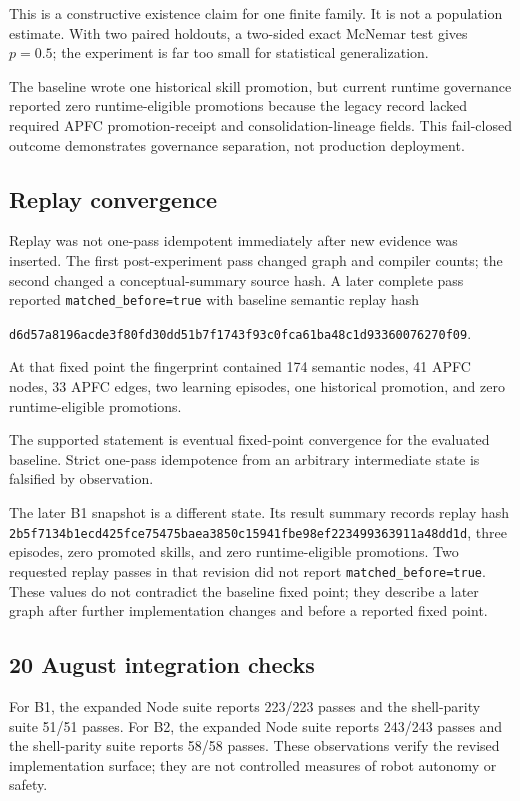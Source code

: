 \documentclass[10pt,twocolumn]{article}
\theoremstyle{definition}
\theoremstyle{plain}
\theoremstyle{remark}
\newcommand{\file}[1]{\nolinkurl{#1}}
\newcommand{\revision}{\textsf{B1}}
\newcommand{\cognitive}{\textsf{B2}}
\begin{document}
This is a constructive existence claim for one finite family.  It is not a population estimate.  With two paired holdouts, a two-sided exact McNemar test gives $p=0.5$; the experiment is far too small for statistical generalization.

The baseline wrote one historical skill promotion, but current runtime governance reported zero runtime-eligible promotions because the legacy record lacked required APFC promotion-receipt and consolidation-lineage fields.  This fail-closed outcome demonstrates governance separation, not production deployment.

\subsection{Replay convergence}
\label{sec:replay-result}

Replay was not one-pass idempotent immediately after new evidence was inserted.  The first post-experiment pass changed graph and compiler counts; the second changed a conceptual-summary source hash.  A later complete pass reported \file{matched_before=true} with baseline semantic replay hash
\begin{center}
\scriptsize\file{d6d57a8196acde3f80fd30dd51b7f1743f93c0fca61ba48c1d93360076270f09}.
\end{center}
At that fixed point the fingerprint contained 174 semantic nodes, 41 APFC nodes, 33 APFC edges, two learning episodes, one historical promotion, and zero runtime-eligible promotions.

The supported statement is eventual fixed-point convergence for the evaluated baseline.  Strict one-pass idempotence from an arbitrary intermediate state is falsified by observation.

The later \revision{} snapshot is a different state.  Its result summary records replay hash \file{2b5f7134b1ecd425fce75475baea3850c15941fbe98ef223499363911a48dd1d}, three episodes, zero promoted skills, and zero runtime-eligible promotions.  Two requested replay passes in that revision did not report \file{matched_before=true}.  These values do not contradict the baseline fixed point; they describe a later graph after further implementation changes and before a reported fixed point.

\subsection{20 August integration checks}

For \revision{}, the expanded Node suite reports 223/223 passes and the shell-parity suite 51/51 passes.  For \cognitive{}, the expanded Node suite reports 243/243 passes and the shell-parity suite reports 58/58 passes.  These observations verify the revised implementation surface; they are not controlled measures of robot autonomy or safety.
\end{document}
